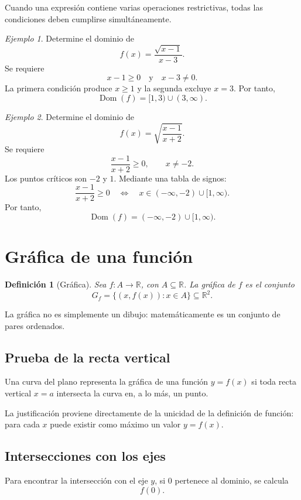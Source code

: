\documentclass[12pt]{article}
\newtheorem{definicion}{Definición}[section]
\theoremstyle{remark}
\newtheorem{ejemplo}{Ejemplo}[section]
\newcommand{\R}{\mathbb{R}}
\newcommand{\Dom}{\operatorname{Dom}}
\begin{document}
Cuando una expresión contiene varias operaciones restrictivas, todas las
condiciones deben cumplirse simultáneamente.

\begin{ejemplo}
Determine el dominio de
\[
f(x)=\frac{\sqrt{x-1}}{x-3}.
\]
Se requiere
\[
x-1\geq0
\quad\text{y}\quad
x-3\neq0.
\]
La primera condición produce $x\geq1$ y la segunda excluye $x=3$. Por tanto,
\[
\Dom(f)=[1,3)\cup(3,\infty).
\]
\end{ejemplo}

\begin{ejemplo}
Determine el dominio de
\[
f(x)=\sqrt{\frac{x-1}{x+2}}.
\]
Se requiere
\[
\frac{x-1}{x+2}\geq0,
\qquad x\neq-2.
\]
Los puntos críticos son $-2$ y $1$. Mediante una tabla de signos:
\[
\frac{x-1}{x+2}\geq0
\quad\Longleftrightarrow\quad
x\in(-\infty,-2)\cup[1,\infty).
\]
Por tanto,
\[
\Dom(f)=(-\infty,-2)\cup[1,\infty).
\]
\end{ejemplo}

\section{Gráfica de una función}

\begin{definicion}[Gráfica]
Sea $f:A\to\R$, con $A\subseteq\R$. La gráfica de $f$ es el conjunto
\[
G_f=\{(x,f(x)):x\in A\}\subseteq\R^2.
\]
\end{definicion}

La gráfica no es simplemente un dibujo: matemáticamente es un conjunto de
pares ordenados.

\subsection{Prueba de la recta vertical}

Una curva del plano representa la gráfica de una función $y=f(x)$ si toda
recta vertical $x=a$ intersecta la curva en, a lo más, un punto.

La justificación proviene directamente de la unicidad de la definición de
función: para cada $x$ puede existir como máximo un valor $y=f(x)$.

\subsection{Intersecciones con los ejes}

Para encontrar la intersección con el eje $y$, si $0$ pertenece al dominio, se
calcula
\[
f(0).
\]
\end{document}
